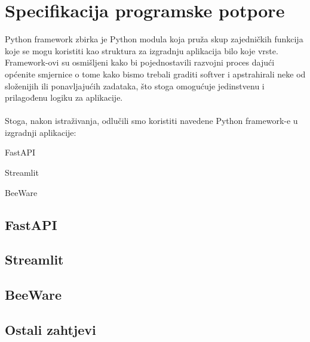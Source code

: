 \chapter{Specifikacija programske potpore}
	Python framework zbirka je Python modula koja pruža skup zajedničkih funkcija koje se mogu koristiti kao struktura za izgradnju aplikacija bilo koje vrste.\\
	Framework-ovi su osmišljeni kako bi pojednostavili razvojni proces dajući općenite smjernice o tome kako bismo trebali graditi softver i apstrahirali neke od složenijih ili ponavljajućih zadataka, što stoga omogućuje jedinstvenu i prilagođenu logiku za aplikacije.\\
	\\
	Stoga, nakon istraživanja, odlučili smo koristiti navedene Python framework-e u izgradnji aplikacije:

	\begin{packed_enum}

		\item FastAPI
		\item Streamlit
		\item BeeWare

	\end{packed_enum}

	\bigskip

	\section{FastAPI}

	\section{Streamlit}

	\section{BeeWare}

	\pagebreak

	\section{Ostali zahtjevi}

